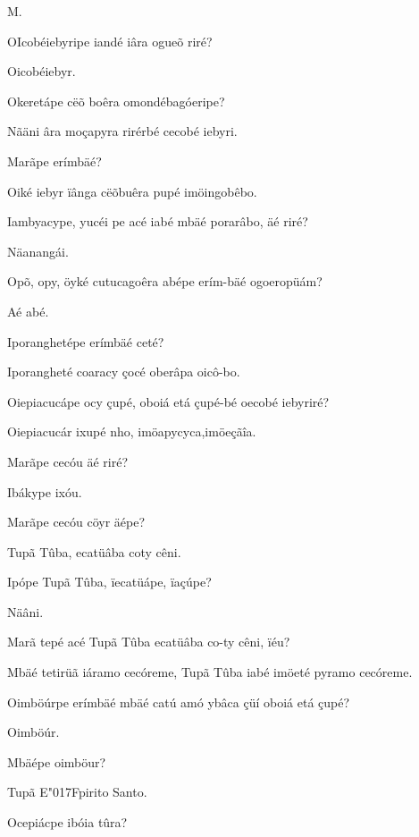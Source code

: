 \documentclass[openany,titlepage,12pt]{book}
\renewcommand{\chaptermark}[1]{\markboth{#1}{}}
\renewcommand{\sectionmark}[1]{\gdef\rightmark{#1}}
\newcommand{\lgS}{\char"017F}
\newcommand{\comecalista}[5]{
    \hspace*{-11.7pt}
    \begin{minipage}[t]{0.08\linewidth}
        \flushright #1\\#2
    \end{minipage}
    \hspace{0pt}
    \begin{minipage}[t]{0.94\linewidth}
        \lettrine
        [findent =2pt, nindent=0pt,  lines=2]
        {#3}{#4}#5
    \end{minipage}
    \vspace*{-3pt}
}
\begin{document}
\chaptermark{Dialogo VII.}
\sectionmark{Da Re\lgS urreiçaõ de Chri\lgS to.}
\vspace*{2pt}

\comecalista{M.}{}{O}{I}
    {cobéiebyripe iandé iâra ogueõ riré?}

\begin{altereven}
    \item Oicobéiebyr.
    \item Okeretápe cëõ boêra omondébagóeripe?
    \item Nãäni âra moçapyra rirérbé cecobé iebyri.
    \item Marãpe erímbäé?
    \item Oiké iebyr ïânga cëõbuêra pupé imöingobêbo.
    \item Iambyacype, yucéi pe acé iabé mbäé porarâbo, äé riré?
    \item Näanangái.
    \item Opõ, opy, öyké cutucagoêra abépe erím-bäé ogoeropüám?
    \item Aé abé.
    \item Iporanghetépe erímbäé ceté?
    \item Iporangheté coaracy çocé oberâpa oicô-bo.
    \item Oiepiacucápe ocy çupé, oboiá etá çupé-bé oecobé iebyriré?
    \item Oiepiacucár ixupé nho, imöapycyca,\linebreak imöeçãîa.
    \item Marãpe cecóu äé riré?
    \item Ibákype ixóu.
    \item Marãpe cecóu cöyr äépe?
    \item Tupã Tûba, ecatüâba coty cêni.
    \item Ipópe Tupã Tûba, ïecatüápe, ïaçúpe?
    \item Näâni.
    \item Marã tepé acé Tupã Tûba ecatüâba co-ty cêni, ïéu?
    \item Mbäé tetirüã iáramo cecóreme, Tupã\linebreak
    Tûba iabé imöeté pyramo cecóreme.
    \item Oimböúrpe erímbäé mbäé catú amó\linebreak
    ybâca çüí oboiá etá çupé?
    \item Oimböúr.
    \item Mbäépe oimböur?
    \item Tupã E\lgS pirito Santo.
    \item Ocepiácpe ibóia tûra?

\end{altereven}
\end{document}
